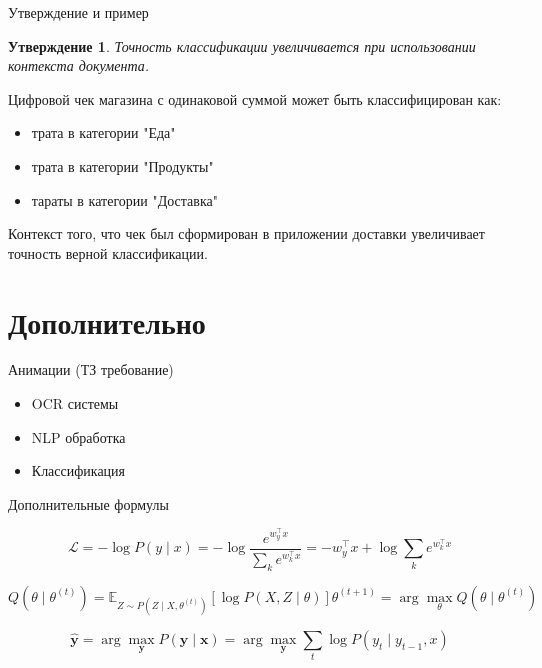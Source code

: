 \documentclass[aspectratio=169]{beamer}
\newtheorem{proposition}{Утверждение}
\begin{document}
\begin{frame}{Утверждение и пример}

\begin{proposition}
Точность классификации увеличивается при использовании контекста документа.
\end{proposition}

\pause

\begin{example}
Цифровой чек магазина с одинаковой суммой может быть классифицирован как:
\begin{itemize}
\item трата в категории "Еда"
\item трата в категории "Продукты"
\item тараты в категории "Доставка"
\end{itemize}
Контекст того, что чек был сформирован в приложении доставки увеличивает точность верной классификации.
\end{example}

\end{frame}

\section{Дополнительно}

\begin{frame}{Анимации (ТЗ требование)}

\begin{itemize}
\item<1-> OCR системы
\item<2-> NLP обработка
\item<3-> Классификация
\end{itemize}

\pause





\end{frame}

\begin{frame}{Дополнительные формулы}

\[
\mathcal{L} = -\log P(y \mid x) 
= -\log \frac{e^{w_y^\top x}}{\sum_k e^{w_k^\top x}} 
= - w_y^\top x + \log \sum_k e^{w_k^\top x}
\]

\[
Q(\theta \mid \theta^{(t)}) =
\mathbb{E}_{Z \sim P(Z \mid X, \theta^{(t)})}
[\log P(X, Z \mid \theta)] 
\theta^{(t+1)} = \arg\max_{\theta} Q(\theta \mid \theta^{(t)})
\]

\[
\hat{\mathbf{y}} = \arg\max_{\mathbf{y}} P(\mathbf{y} \mid \mathbf{x}) 
= \arg\max_{\mathbf{y}} \sum_t \log P(y_t \mid y_{t-1}, x)
\]

\end{frame}
\end{document}
